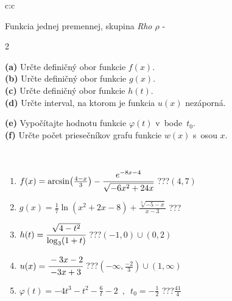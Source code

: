 \documentclass[10pt]{report}
\begin{document}
\begin{tabular}{c:c}
\begin{minipage}[c][104.5mm][t]{0.5\linewidth}
\begin{center}
\vspace{7mm}
{\huge Funkcia jednej premennej, skupina \textit{Rho $\rho$} -}\\[5mm]
\begin{minipage}{0.95\linewidth}
\begin{center}
{\small \begin{multicols}{2} \raggedright
\textbf{(a)} Určte definičný obor funkcie \(f(x)\). \\[1mm]
\textbf{(b)} Určte definičný obor funkcie \(g(x)\). \\[1mm]
\textbf{(c)} Určte definičný obor funkcie \(h(t)\). \\[1mm]
\textbf{(d)} Určte interval, na ktorom je funkcia \(u(x)\) nezáporná. \par \columnbreak
\textbf{(e)} Vypočítajte hodnotu funkcie \(\varphi(t)\) v~bode~\(t_0\). \\[1mm]
\textbf{(f)} Určte počet priesečníkov grafu funkcie \(w(x)\) s~osou \(x\). \\[1mm]
\end{multicols}
}
\end{center}
\end{minipage}
\\[4mm]
\begin{minipage}{0.79\linewidth}
\begin{center}
\begin{varwidth}{\linewidth}
\begin{enumerate}
\small
\item $f(x) = \arcsin\!\left( \frac{4-x}{3} \right) - \cfrac{e^{-8x-4}}{\sqrt{-6x^2+24x}}$\quad \dotfill\; ???\;\dotfill \quad $\left(4 , 7\right)$
\item $g(x) = \frac{1}{7} \ln{\!(x^2+2x-8)}+\frac{\sqrt[3]{-5-x}}{x-3}$\quad \dotfill\; ???\;\dotfill {}
\item $h(t) = \cfrac{\sqrt{4-t^2}}{\log_3(1+t)}$\quad \dotfill\; ???\;\dotfill \quad $\left(-1 , 0\right)\cup\left(0 , 2\right)$
\item $u(x) = \cfrac{-3x-2}{-3x+3}$\quad \dotfill\; ???\;\dotfill \quad $\left(-\infty , \frac{-2}{3}\right)\cup\left(1 , \infty\right)$
\item $\varphi(t) = -4t^3-t^2-\frac{6}{t}-2 \enspace , \enspace t_0=-\frac{1}{2}$\quad \dotfill\; ???\;\dotfill \quad $\frac{41}{4}$

\end{enumerate}
\end{varwidth}
\end{center}
\end{minipage}
\end{center}
\end{minipage}
\end{tabular}
\end{document}
